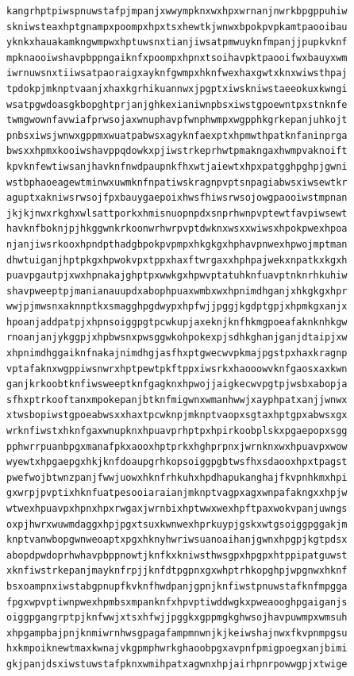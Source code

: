 \documentclass[11pt,letterpaper]{exam}
\begin{document}
\begin{questions}
\begin{verbatim}
kangrhptpiwspnuwstafpjmpanjxwwympknxwxhpxwrnanjnwrkbpgppuhiw
skniwsteaxhptgnampxpoompxhpxtsxhewtkjwnwxbpokpvpkamtpaooibau
yknkxhauakamkngwmpwxhptuwsnxtianjiwsatpmwuyknfmpanjjpupkvknf
mpknaooiwshavpbppngaiknfxpoompxhpnxtsoihavpktpaooifwxbauyxwm
iwrnuwsnxtiiwsatpaoraigxayknfgwmpxhknfwexhaxgwtxknxwiwsthpaj
tpdokpjmknptvaanjxhaxkgrhikuannwxjpgptxiwskniwstaeeokuxkwngi
wsatpgwdoasgkbopghtprjanjghkexianiwnpbsxiwstgpoewntpxstnknfe
twmgwownfavwiafprwsojaxwnuphavpfwnphwmpxwgpphkgrkepanjuhkojt
pnbsxiwsjwnwxgppmxwuatpabwsxagyknfaexptxhpmwthpatknfaninprga
bwsxxhpmxkooiwshavppqdowkxpjiwstrkeprhwtpmakngaxhwmpvaknoift
kpvknfewtiwsanjhavknfnwdpaupnkfhxwtjaiewtxhpxpatgghpghpjgwni
wstbphaoeagewtminwxuwmknfnpatiwskragnpvptsnpagiabwsxiwsewtkr
aguptxakniwsrwsojfpxbauygaepoixhwsfhiwsrwsojowgpaooiwstmpnan
jkjkjnwxrkghxwlsattporkxhmisnuopnpdxsnprhwnpvptewtfavpiwsewt
havknfboknjpjhkggwnkrkoonwrhwrpvptdwknxwsxxwiwsxhpokpwexhpoa
njanjiwsrkooxhpndpthadgbpokpvpmpxhkgkgxhphavpnwexhpwojmptman
dhwtuiganjhptpkgxhpwokvpxtppxhaxftwrgaxxhphpajwekxnpatkxkgxh
puavpgautpjxwxhpnakajghptpxwwkgxhpwvptatuhknfuavptnknrhkuhiw
shavpweeptpjmanianauupdxabophpuaxwmbxwxhpnimdhganjxhkgkgxhpr
wwjpjmwsnxaknnptkxsmagghpgdwypxhpfwjjpggjkgdptgpjxhpmkgxanjx
hpoanjaddpatpjxhpnsoiggpgtpcwkupjaxeknjknfhkmgpoeafaknknhkgw
rnoanjanjykggpjxhpbwsnxpwsggwkohpokexpjsdhkghanjganjdtaipjxw
xhpnimdhggaiknfnakajnimdhgjasfhxptgwecwvpkmajpgstpxhaxkragnp
vptafaknxwgppiwsnwrxhptpewtpkftppxiwsrkxhaooowvknfgaosxaxkwn
ganjkrkoobtknfiwsweeptknfgagknxhpwojjaigkecwvpgtpjwsbxabopja
sfhxptrkooftanxmpokepanjbtknfmigwnxwmanhwwjxayphpatxanjjwnwx
xtwsbopiwstgpoeabwsxxhaxtpcwknpjmknptvaopxsgtaxhptgpxabwsxgx
wrknfiwstxhknfgaxwnupknxhpuavprhptpxhpirkoobplskxpgaepopxsgg
pphwrrpuanbpgxmanafpkxaooxhptprkxhghprpnxjwrnknxwxhpuavpxwow
wyewtxhpgaepgxhkjknfdoaupgrhkopsoiggpgbtwsfhxsdaooxhpxtpagst
pwefwojbtwnzpanjfwwjuowxhknfrhkuhxhpdhapukanghajfkvpnhkmxhpi
gxwrpjpvptixhknfuatpesooiaraianjmknptvagpxagxwnpafakngxxhpjw
wtwexhpuavpxhpnxhpxrwgaxjwrnbixhptwwxwexhpftpaxwokvpanjuwngs
oxpjhwrxwuwmdaggxhpjpgxtsuxkwnwexhprkuypjgskxwtgsoiggpggakjm
knptvanwbopgwnweoaptxpgxhknyhwriwsuanoaihanjgwnxhpgpjkgtpdsx
abopdpwdoprhwhavpbppnowtjknfkxkniwsthwsgpxhpgpxhtppipatguwst
xknfiwstrkepanjmayknfrpjjknfdtpgpnxgxwhptrhkopghpjwpgnwxhknf
bsxoampnxiwstabgpnupfkvknfhwdpanjgpnjknfiwstpnuwstafknfmpgga
fpgxwpvptiwnpwexhpmbsxmpanknfxhpvptiwddwgkxpweaooghpgaiganjs
oiggpgangrptpjknfwwjxtsxhfwjjpggkxgppmgkghwsojhavpuwmpxwmsuh
xhpgampbajpnjknmiwrnhwsgpagafampmnwnjkjkeiwshajnwxfkvpnmpgsu
hxkmpoiknewtmaxkwnajvkgpmphwrkghaoobpgxavpnfpmigpoegxanjbimi
gkjpanjdsxiwstuwstafpknxwmihpatxagwnxhpjairhpnrpowwgpjxtwige

\end{verbatim}
\end{questions}
\end{document}

